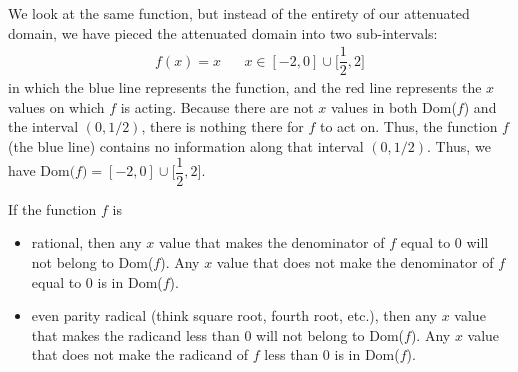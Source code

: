 \begin{example}
We look at the same function, but instead of the entirety of our attenuated domain, we have pieced the attenuated domain into two sub-intervals:
\begin{align*}
    f(x) = x \hspace{20pt} x \in [-2, 0] \cup \Big[\dfrac{1}{2}, 2\Big]
\end{align*}
in which the blue line represents the function, and the red line represents the $x$ values on which $f$ is acting. Because there are not $x$ values in both Dom($f$) and the interval $(0, 1/2)$, there is nothing there for $f$ to act on. Thus, the function $f$ (the blue line) contains no information along that interval $(0, 1/2)$. Thus, we have $\text{Dom($f$)} = [-2, 0] \cup \Big[\dfrac{1}{2}, 2\Big]$.

\vspace{0.5in}
\end{example}

\begin{recall}
If the function $f$ is
\begin{itemize}
    \item rational, then any $x$ value that makes the denominator of $f$ equal to $0$ will not belong to Dom($f$). Any $x$ value that does not make the denominator of $f$ equal to $0$ is in Dom($f$).\\
    \item even parity radical (think square root, fourth root, etc.), then any $x$ value that makes the radicand less than $0$ will not belong to Dom($f$). Any $x$ value that does not make the radicand of $f$ less than $0$ is in Dom($f$).
\end{itemize}
\end{recall}

